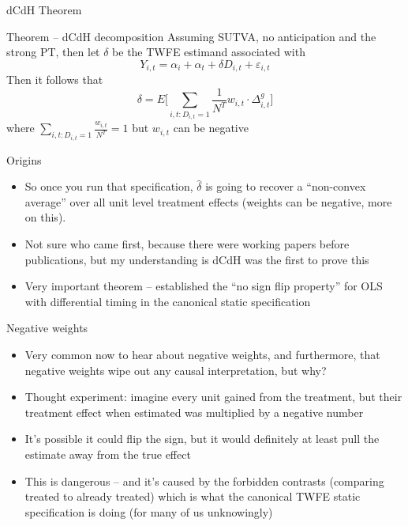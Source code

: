 \documentclass{beamer}
\begin{document}
\begin{frame}{dCdH Theorem}

\begin{block}{Theorem -- dCdH decomposition}
Assuming SUTVA, no anticipation and the strong PT, then let $\delta$ be the TWFE estimand associated with $$Y_{i,t} = \alpha_i + \alpha_t + \delta D_{i,t} + \varepsilon_{i,t}$$Then it follows that $$\delta = E \bigg [ \sum_{i,t:D_{i,t}=1} \frac{1}{N^T} w_{i,t} \cdot \Delta_{i,t}^g \bigg ] $$ where $\sum_{i,t:D_{i,t}=1} \frac{w_{i,t}}{N^T} = 1$ but $w_{i,t}$ can be negative
\end{block}

\end{frame}

\begin{frame}{Origins}

\begin{itemize}
\item So once you run that specification, $\widehat{\delta}$ is going to recover a ``non-convex average'' over all unit level treatment effects (weights can be negative, more on this). 
\item Not sure who came first, because there were working papers before publications, but my understanding is dCdH was the first to prove this
\item Very important theorem -- established the ``no sign flip property'' for OLS with differential timing in the canonical static specification
\end{itemize}

\end{frame}


\begin{frame}{Negative weights}

\begin{itemize}
\item Very common now to hear about negative weights, and furthermore, that negative weights wipe out any causal interpretation, but why?
\item Thought experiment: imagine every unit gained from the treatment, but their treatment effect when estimated was multiplied by a negative number
\item It's possible it could flip the sign, but it would definitely at least pull the estimate away from the true effect
\item This is dangerous -- and it's caused by the forbidden contrasts (comparing treated to already treated) which is what the canonical TWFE static specification is doing (for many of us unknowingly)
\end{itemize}

\end{frame}
\end{document}
